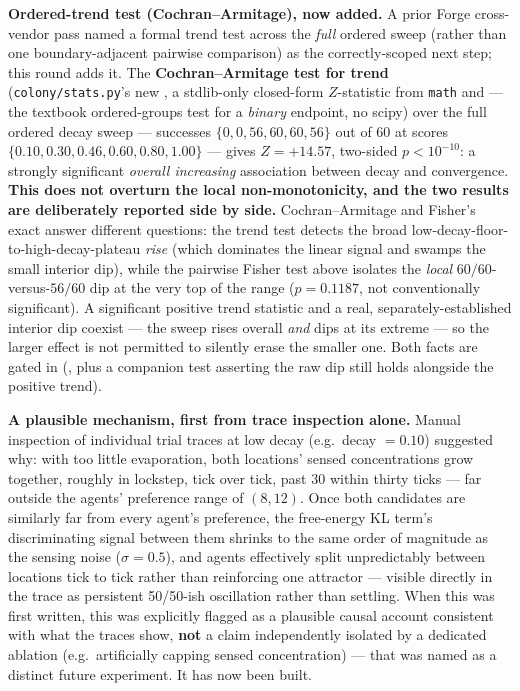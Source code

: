 \documentclass[
  english,
]{article}
\theoremstyle{definition}
\begin{document}
\textbf{Ordered-trend test (Cochran--Armitage), now added.} A prior
Forge cross-vendor pass named a formal trend test across the \emph{full}
ordered sweep (rather than one boundary-adjacent pairwise comparison) as
the correctly-scoped next step; this round adds it. The
\textbf{Cochran--Armitage test for trend} (\texttt{colony/stats.py}'s
new , a stdlib-only closed-form
\(Z\)-statistic from \texttt{math} and 
--- the textbook ordered-groups test for a \emph{binary} endpoint, no
scipy) over the full ordered decay sweep --- successes
\(\{0, 0, 56, 60, 60, 56\}\) out of \(60\) at scores
\(\{0.10, 0.30, 0.46, 0.60, 0.80, 1.00\}\) --- gives \(Z = +14.57\),
two-sided \(p < 10^{-10}\): a strongly significant \emph{overall
increasing} association between decay and convergence. \textbf{This does
not overturn the local non-monotonicity, and the two results are
deliberately reported side by side.} Cochran--Armitage and Fisher's
exact answer different questions: the trend test detects the broad
low-decay-floor-to-high-decay-plateau \emph{rise} (which dominates the
linear signal and swamps the small interior dip), while the pairwise
Fisher test above isolates the \emph{local} \(60/60\)-versus-\(56/60\)
dip at the very top of the range (\(p = 0.1187\), not conventionally
significant). A significant positive trend statistic and a real,
separately-established interior dip coexist --- the sweep rises overall
\emph{and} dips at its extreme --- so the larger effect is not permitted
to silently erase the smaller one. Both facts are gated in
(,
plus a companion test asserting the raw dip still holds alongside the
positive trend).

\textbf{A plausible mechanism, first from trace inspection alone.}
Manual inspection of individual trial traces at low decay (e.g.~decay
\(=0.10\)) suggested why: with too little evaporation, both locations'
sensed concentrations grow together, roughly in lockstep, tick over
tick, past \(30\) within thirty ticks --- far outside the agents'
preference range of \((8, 12)\). Once both candidates are similarly far
from every agent's preference, the free-energy KL term's discriminating
signal between them shrinks to the same order of magnitude as the
sensing noise (\(\sigma=0.5\)), and agents effectively split
unpredictably between locations tick to tick rather than reinforcing one
attractor --- visible directly in the trace as persistent 50/50-ish
oscillation rather than settling. When this was first written, this was
explicitly flagged as a plausible causal account consistent with what
the traces show, \textbf{not} a claim independently isolated by a
dedicated ablation (e.g.~artificially capping sensed concentration) ---
that was named as a distinct future experiment. It has now been built.
\end{document}
